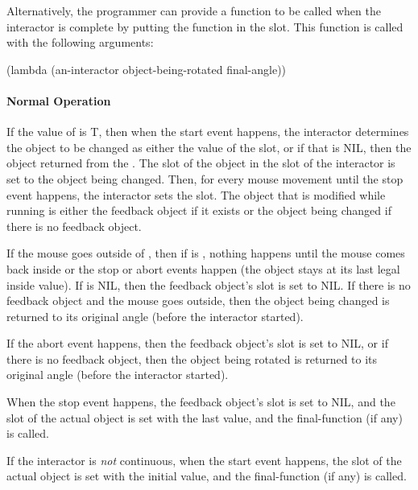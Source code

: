 Alternatively, the programmer can provide a function to be called when the
interactor is complete by putting the function in the 
slot.  This function is called with the following arguments:
\begin{programexample}
(lambda (an-interactor object-being-rotated final-angle))
\end{programexample}

\paragraph{Normal Operation}

If the value of  is T,
then when the start event happens, the interactor determines the object to
be changed as
either the value of the  slot, or if that is NIL, then
the object returned from the .
The  slot of the object in
the  slot of the interactor is set to the object being changed.
Then, for every mouse movement until the stop event happens, the interactor sets
the  slot.  The object that is modified while
running is either the feedback object if it exists or the object being changed
if there is no feedback object.

If the mouse goes outside of , then if  is
, nothing happens until the mouse comes back inside or the stop
or abort events happen (the object stays at its last legal inside value).
If  is NIL, then the feedback
object's  slot is set to NIL.
If there is no feedback object and the mouse goes outside, then the object
being changed is returned to its original angle (before the
interactor started).

If the abort event happens, then the feedback
object's  slot is set to NIL, or if there is no feedback
object, then the object being rotated is returned to its original angle
(before the interactor started).

When the stop event happens, the feedback object's  slot is
set to NIL, and the  slot of the actual object is
set with the last value, and the final-function
(if any) is called.

If the interactor is {\it not} continuous, when the start event happens, the
 slot of the actual object is
set with the initial value, and the final-function
(if any) is called.

